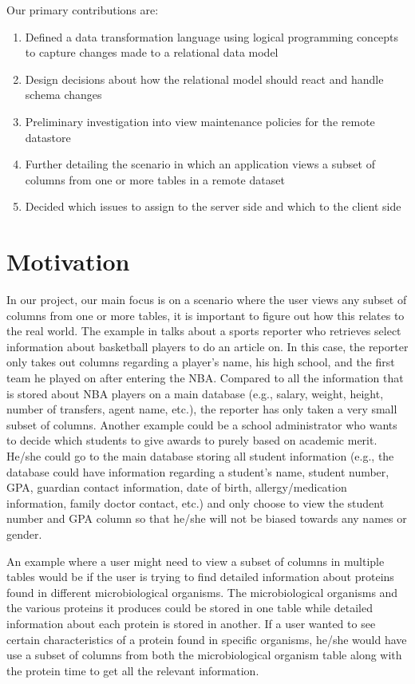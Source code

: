 \documentclass[12pt]{article}
\begin{document}
\noindent Our primary contributions are:
\begin{enumerate}
	\item{Defined a data transformation language using logical programming concepts to capture changes made to a relational data model}
	\item{Design decisions about how the relational model should react and handle schema changes}
	\item{Preliminary investigation into view maintenance policies for the remote datastore}
	\item{Further detailing the scenario in which an application views a subset of columns from one or more tables in a remote dataset}
	\item{Decided which issues to assign to the server side and which to the client side}
\end{enumerate}

\section{Motivation}
In our project, our main focus is on a scenario where the user views any subset of columns from one or more tables, it is important to figure out how this relates to the real world. The example in \cite{arniThesis} talks about a sports reporter who retrieves select information about basketball players to do an article on. In this case, the reporter only takes out columns regarding a player's name, his high school, and the first team he played on after entering the NBA. Compared to all the information that is stored about NBA players on a main database (e.g., salary, weight, height, number of transfers, agent name, etc.), the reporter has only taken a very small subset of columns. Another example could be a school administrator who wants to decide which students to give awards to purely based on academic merit. He/she could go to the main database storing all student information (e.g., the database could have information regarding a student's name, student number, GPA, guardian contact information, date of birth, allergy/medication information, family doctor contact, etc.) and only choose to view the student number and GPA column so that he/she will not be biased towards any names or gender.

An example where a user might need to view a subset of columns in multiple tables would be if the user is trying to find detailed information about proteins found in different microbiological organisms. The microbiological organisms and the various proteins it produces could be stored in one table while detailed information about each protein is stored in another. If a user wanted to see certain characteristics of a protein found in specific organisms, he/she would have use a subset of columns from both the microbiological organism table along with the protein time to get all the relevant information.
\end{document}

